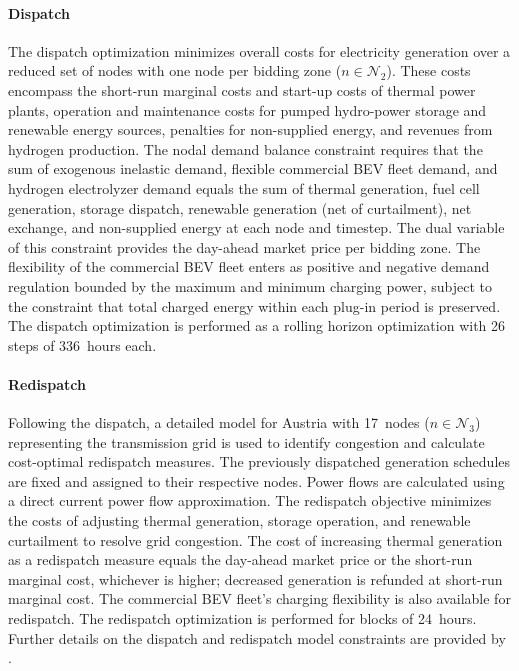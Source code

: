 \paragraph*{Dispatch} The dispatch optimization minimizes overall costs for electricity generation over a reduced set of nodes with one node per bidding zone ($n \in \mathcal{N}_2$). These costs encompass the short-run marginal costs and start-up costs of thermal power plants, operation and maintenance costs for pumped hydro-power storage and renewable energy sources, penalties for non-supplied energy, and revenues from hydrogen production. The nodal demand balance constraint requires that the sum of exogenous inelastic demand, flexible commercial \ac{BEV} fleet demand, and hydrogen electrolyzer demand equals the sum of thermal generation, fuel cell generation, storage dispatch, renewable generation (net of curtailment), net exchange, and non-supplied energy at each node and timestep. The dual variable of this constraint provides the day-ahead market price per bidding zone. The flexibility of the commercial \ac{BEV} fleet enters as positive and negative demand regulation bounded by the maximum and minimum charging power, subject to the constraint that total charged energy within each plug-in period is preserved. The dispatch optimization is performed as a rolling horizon optimization with 26 steps of 336~hours each.

\paragraph*{Redispatch} Following the dispatch, a detailed model for Austria with 17~nodes ($n \in \mathcal{N}_3$) representing the transmission grid is used to identify congestion and calculate cost-optimal redispatch measures. The previously dispatched generation schedules are fixed and assigned to their respective nodes. Power flows are calculated using a direct current power flow approximation. The redispatch objective minimizes the costs of adjusting thermal generation, storage operation, and renewable curtailment to resolve grid congestion. The cost of increasing thermal generation as a redispatch measure equals the day-ahead market price or the short-run marginal cost, whichever is higher; decreased generation is refunded at short-run marginal cost. The commercial \ac{BEV} fleet's charging flexibility is also available for redispatch. The redispatch optimization is performed for blocks of 24~hours. Further details on the dispatch and redispatch model constraints are provided by \citet{LOSCHAN2023108802}.

